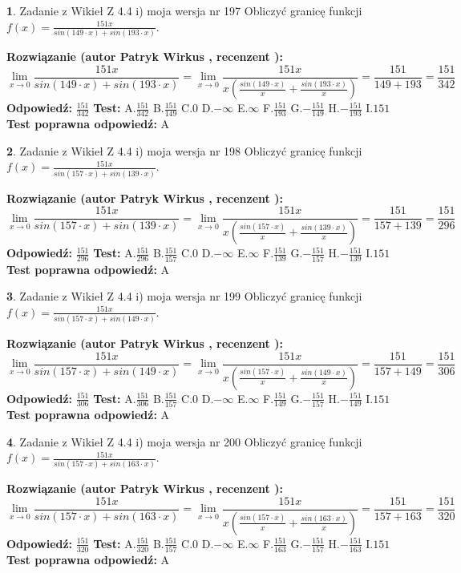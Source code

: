 \documentclass[12pt, a4paper]{article}
\theoremstyle{definition} %
\newtheorem{zad}{}
\newcommand{\zadStart}[1]{\begin{zad}#1\newline}
\newcommand{\zadStop}{\end{zad}}
\newcommand{\rozwStart}[2]{\noindent \textbf{Rozwiązanie (autor #1 , recenzent #2): }\newline}
\newcommand{\rozwStop}{\newline}
\newcommand{\odpStart}{\noindent \textbf{Odpowiedź:}\newline}
\newcommand{\odpStop}{\newline}
\newcommand{\testStart}{\noindent \textbf{Test:}\newline}
\newcommand{\testStop}{\newline}
\newcommand{\kluczStart}{\noindent \textbf{Test poprawna odpowiedź:}\newline}
\newcommand{\kluczStop}{\newline}
\begin{document}
\zadStart{Zadanie z Wikieł Z 4.4 i) moja wersja nr 197}
Obliczyć granicę funkcji $f(x)=\frac{151x}{sin(149\cdot x) +sin(193\cdot x)}$.
\zadStop
\rozwStart{Patryk Wirkus}{}
$$\lim\limits_{x\to 0}\frac{151x}{sin(149\cdot x) +sin(193\cdot x)}=\lim\limits_{x\to 0}\frac{151x}{x(\frac{sin(149\cdot x)}{x}+\frac{sin(193\cdot x)}{x})}=\frac{151}{149+193} = \frac{151}{342}$$
\rozwStop
\odpStart
$\frac{151}{342}$
\odpStop
\testStart
A.$\frac{151}{342}$
B.$\frac{151}{149}$
C.$0$
D.$-\infty$
E.$\infty$
F.$\frac{151}{193}$
G.$-\frac{151}{149}$
H.$-\frac{151}{193}$
I.$151$
\testStop
\kluczStart
A
\kluczStop



\zadStart{Zadanie z Wikieł Z 4.4 i) moja wersja nr 198}
Obliczyć granicę funkcji $f(x)=\frac{151x}{sin(157\cdot x) +sin(139\cdot x)}$.
\zadStop
\rozwStart{Patryk Wirkus}{}
$$\lim\limits_{x\to 0}\frac{151x}{sin(157\cdot x) +sin(139\cdot x)}=\lim\limits_{x\to 0}\frac{151x}{x(\frac{sin(157\cdot x)}{x}+\frac{sin(139\cdot x)}{x})}=\frac{151}{157+139} = \frac{151}{296}$$
\rozwStop
\odpStart
$\frac{151}{296}$
\odpStop
\testStart
A.$\frac{151}{296}$
B.$\frac{151}{157}$
C.$0$
D.$-\infty$
E.$\infty$
F.$\frac{151}{139}$
G.$-\frac{151}{157}$
H.$-\frac{151}{139}$
I.$151$
\testStop
\kluczStart
A
\kluczStop



\zadStart{Zadanie z Wikieł Z 4.4 i) moja wersja nr 199}
Obliczyć granicę funkcji $f(x)=\frac{151x}{sin(157\cdot x) +sin(149\cdot x)}$.
\zadStop
\rozwStart{Patryk Wirkus}{}
$$\lim\limits_{x\to 0}\frac{151x}{sin(157\cdot x) +sin(149\cdot x)}=\lim\limits_{x\to 0}\frac{151x}{x(\frac{sin(157\cdot x)}{x}+\frac{sin(149\cdot x)}{x})}=\frac{151}{157+149} = \frac{151}{306}$$
\rozwStop
\odpStart
$\frac{151}{306}$
\odpStop
\testStart
A.$\frac{151}{306}$
B.$\frac{151}{157}$
C.$0$
D.$-\infty$
E.$\infty$
F.$\frac{151}{149}$
G.$-\frac{151}{157}$
H.$-\frac{151}{149}$
I.$151$
\testStop
\kluczStart
A
\kluczStop



\zadStart{Zadanie z Wikieł Z 4.4 i) moja wersja nr 200}
Obliczyć granicę funkcji $f(x)=\frac{151x}{sin(157\cdot x) +sin(163\cdot x)}$.
\zadStop
\rozwStart{Patryk Wirkus}{}
$$\lim\limits_{x\to 0}\frac{151x}{sin(157\cdot x) +sin(163\cdot x)}=\lim\limits_{x\to 0}\frac{151x}{x(\frac{sin(157\cdot x)}{x}+\frac{sin(163\cdot x)}{x})}=\frac{151}{157+163} = \frac{151}{320}$$
\rozwStop
\odpStart
$\frac{151}{320}$
\odpStop
\testStart
A.$\frac{151}{320}$
B.$\frac{151}{157}$
C.$0$
D.$-\infty$
E.$\infty$
F.$\frac{151}{163}$
G.$-\frac{151}{157}$
H.$-\frac{151}{163}$
I.$151$
\testStop
\kluczStart
A
\kluczStop
\end{document}
